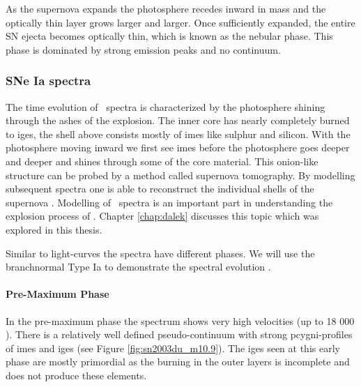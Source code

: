 As the supernova expands the photosphere recedes inward in mass and the optically thin layer grows larger and larger. Once sufficiently expanded, the entire SN ejecta becomes optically thin, which is known as the nebular phase. This phase is dominated by strong emission peaks and no continuum. 


\subsubsection{SNe Ia spectra}
\label{sec:intro_sneia_spectra}
The time evolution of \sneia\ spectra is characterized by the photosphere shining through the ashes of the explosion. The inner core has nearly completely burned to \glspl{ige}, the shell above consists mostly of \glspl{ime} like sulphur and silicon. With the photosphere moving inward we first see \glspl{ime} before the photosphere goes deeper and deeper and shines through some of the core material. This onion-like structure can be probed by a method called supernova tomography. By modelling subsequent spectra one is able to reconstruct the individual shells of the supernova \citep{2005MNRAS.360.1231S, 2009MNRAS.399.1238H}. 
Modelling of \sneia\ spectra is an important part in understanding the explosion process of \sneia. Chapter \ref{chap:dalek} discusses this topic which was explored in this thesis.

Similar to light-curves the spectra have different phases. We will use the \gls{branchnormal} Type Ia  to demonstrate the spectral evolution \citep{2011MNRAS.410.1725T}. 

\paragraph{Pre-Maximum Phase}
In the pre-maximum phase the spectrum shows very high velocities (up to 18 000 \kms). There is a relatively well defined pseudo-continuum with strong \gls{pcygni}-profiles of \glspl{ime} and \glspl{ige} (see Figure \ref{fig:sn2003du_m10.9}). The \glspl{ige} seen at this early phase are mostly primordial as the burning in the outer layers  is incomplete and does not produce these elements. 


